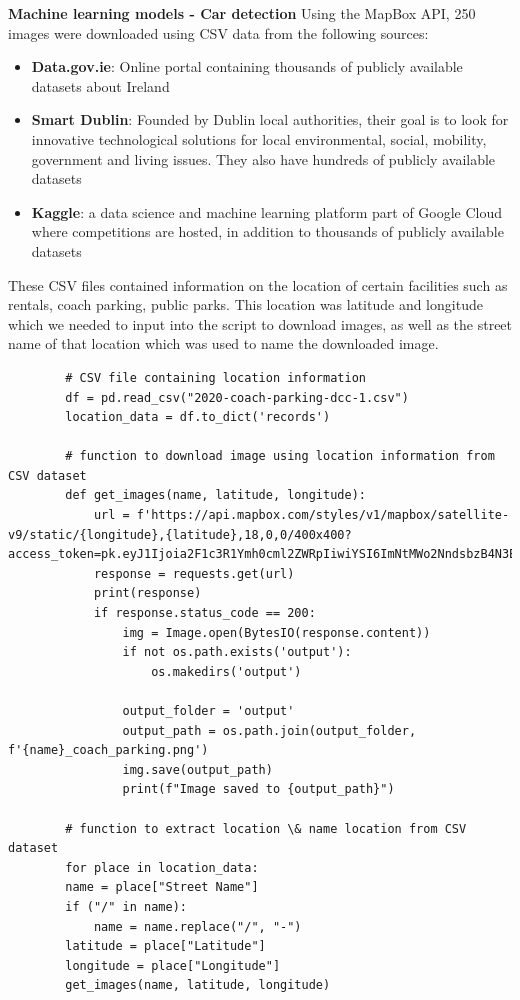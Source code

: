 \textbf{Machine learning models - Car detection}
Using the MapBox API, 250 images were downloaded using CSV data from the following sources:
\begin{itemize}
    \item \textbf{Data.gov.ie}: Online portal containing thousands of publicly available datasets about Ireland
    \item \textbf{Smart Dublin}: Founded by Dublin local authorities, their goal is to look for innovative technological solutions for local environmental, social, mobility, government and living issues. They also have hundreds of publicly available datasets
    \item \textbf{Kaggle}: a data science and machine learning platform part of Google Cloud where competitions are hosted, in addition to thousands of publicly available datasets
\end{itemize}
These CSV files contained information on the location of certain facilities such as rentals, coach parking, public parks. This location was latitude and longitude which we needed to input into the script to download images, as well as the street name of that location which was used to name the downloaded image.
\begin{listing}[h!]
    \centering
    \begin{verbatim}
        # CSV file containing location information
        df = pd.read_csv("2020-coach-parking-dcc-1.csv")
        location_data = df.to_dict('records')

        # function to download image using location information from CSV dataset
        def get_images(name, latitude, longitude):
            url = f'https://api.mapbox.com/styles/v1/mapbox/satellite-v9/static/{longitude},{latitude},18,0,0/400x400?access_token=pk.eyJ1Ijoia2F1c3R1Ymh0cml2ZWRpIiwiYSI6ImNtMWo2NndsbzB4N3EycHM1aGF2cDd5NzkifQ.4aegzX6Kfy3zW8pHkLWU7Q'
            response = requests.get(url)
            print(response)
            if response.status_code == 200:
                img = Image.open(BytesIO(response.content))
                if not os.path.exists('output'):
                    os.makedirs('output')

                output_folder = 'output'
                output_path = os.path.join(output_folder, f'{name}_coach_parking.png')
                img.save(output_path)
                print(f"Image saved to {output_path}")

        # function to extract location \& name location from CSV dataset
        for place in location_data:
        name = place["Street Name"]
        if ("/" in name):
            name = name.replace("/", "-")
        latitude = place["Latitude"]
        longitude = place["Longitude"]
        get_images(name, latitude, longitude)
    \end{verbatim}
\end{listing}\\

